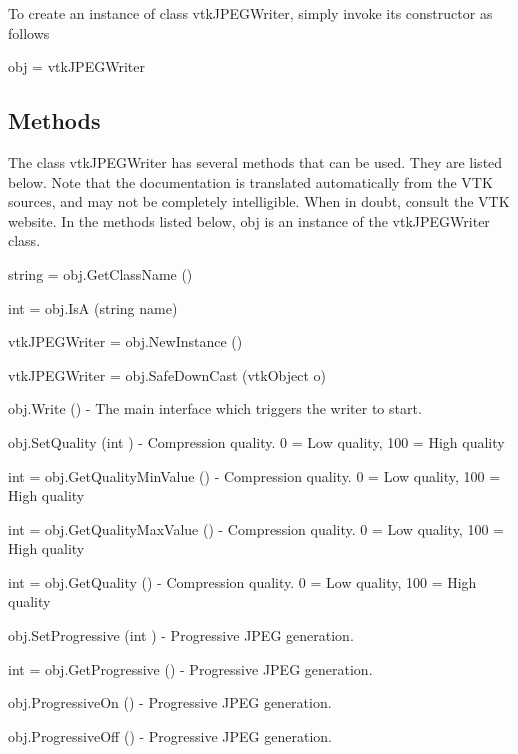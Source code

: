 To create an instance of class vtk\-J\-P\-E\-G\-Writer, simply invoke its constructor as follows \begin{DoxyVerb}  obj = vtkJPEGWriter
\end{DoxyVerb}
 \hypertarget{vtkwidgets_vtkxyplotwidget_Methods}{}\subsection{Methods}\label{vtkwidgets_vtkxyplotwidget_Methods}
The class vtk\-J\-P\-E\-G\-Writer has several methods that can be used. They are listed below. Note that the documentation is translated automatically from the V\-T\-K sources, and may not be completely intelligible. When in doubt, consult the V\-T\-K website. In the methods listed below, {\ttfamily obj} is an instance of the vtk\-J\-P\-E\-G\-Writer class. 
\begin{DoxyItemize}
\item {\ttfamily string = obj.\-Get\-Class\-Name ()}  
\item {\ttfamily int = obj.\-Is\-A (string name)}  
\item {\ttfamily vtk\-J\-P\-E\-G\-Writer = obj.\-New\-Instance ()}  
\item {\ttfamily vtk\-J\-P\-E\-G\-Writer = obj.\-Safe\-Down\-Cast (vtk\-Object o)}  
\item {\ttfamily obj.\-Write ()} -\/ The main interface which triggers the writer to start.  
\item {\ttfamily obj.\-Set\-Quality (int )} -\/ Compression quality. 0 = Low quality, 100 = High quality  
\item {\ttfamily int = obj.\-Get\-Quality\-Min\-Value ()} -\/ Compression quality. 0 = Low quality, 100 = High quality  
\item {\ttfamily int = obj.\-Get\-Quality\-Max\-Value ()} -\/ Compression quality. 0 = Low quality, 100 = High quality  
\item {\ttfamily int = obj.\-Get\-Quality ()} -\/ Compression quality. 0 = Low quality, 100 = High quality  
\item {\ttfamily obj.\-Set\-Progressive (int )} -\/ Progressive J\-P\-E\-G generation.  
\item {\ttfamily int = obj.\-Get\-Progressive ()} -\/ Progressive J\-P\-E\-G generation.  
\item {\ttfamily obj.\-Progressive\-On ()} -\/ Progressive J\-P\-E\-G generation.  
\item {\ttfamily obj.\-Progressive\-Off ()} -\/ Progressive J\-P\-E\-G generation.  

\end{DoxyItemize}
